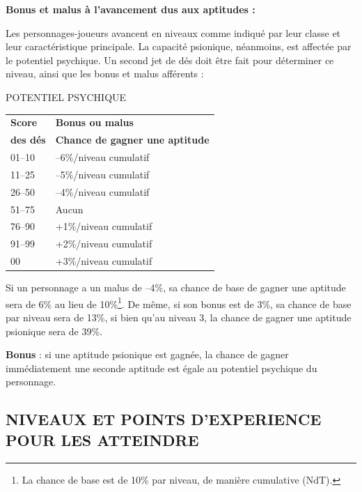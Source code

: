 \documentclass[11pt]{article}
\begin{document}
{\bigskip

\textbf{Bonus et malus à l'avancement dus aux aptitudes :}

\bigskip

Les personnages-joueurs avancent en niveaux comme indiqué par leur classe et leur caractéristique principale. La capacité psionique, néanmoins, est affectée par le potentiel psychique. Un second jet de dés doit être fait pour déterminer ce niveau, ainsi que les bonus et malus afférents :

\bigskip

{\parindent3cm POTENTIEL PSYCHIQUE

\bigskip

\begin{tabular}{p{3cm}l}
\textbf{Score} & \textbf{Bonus ou malus} \\
\textbf{des dés} & \textbf{Chance de gagner une aptitude} \\
01--10 & --6\%/niveau cumulatif \\
11--25 & --5\%/niveau cumulatif \\
26--50 & --4\%/niveau cumulatif \\
51--75 & Aucun \\
76--90 & +1\%/niveau cumulatif \\
91--99 & +2\%/niveau cumulatif \\
\hspace{0.4cm}00 & +3\%/niveau cumulatif \\
\end{tabular}}

\bigskip

Si un personnage a un malus de --4\%, sa chance de base de gagner une aptitude sera de 6\% au lieu de 10\%\footnote{La chance de base est de 10\% par niveau, de manière cumulative (NdT).}. De même, si son bonus est de 3\%, sa chance de base par niveau sera de 13\%, si bien qu'au niveau 3, la chance de gagner une aptitude psionique sera de 39\%.

\bigskip

\textbf{Bonus} : si une aptitude psionique est gagnée, la chance de gagner immédiatement une seconde aptitude est égale au potentiel psychique du personnage.

\subsection*{\normalsize NIVEAUX ET POINTS D'EXPERIENCE POUR LES ATTEINDRE}

}
\end{document}
